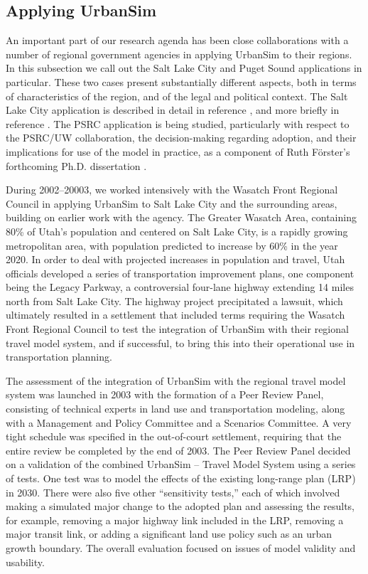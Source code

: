 
\subsection{Applying UrbanSim}
\label{sec:urbansim-applications}

An important part of our research agenda has been close collaborations with
a number of regional government agencies in applying UrbanSim to their
regions.  In this subsection we call out the Salt Lake City and Puget Sound
applications in particular.  These two cases present substantially
different aspects, both in terms of characteristics of the region, and of
the legal and political context.  The Salt Lake City application is
described in detail in reference \cite{waddell-wfrc-2006}, and more briefly
in reference \cite{waddell-sscr-2004}.  The PSRC application is being
studied, particularly with respect to the PSRC/UW collaboration, the
decision-making regarding adoption, and their implications for use of the
model in practice, as a component of Ruth F\"{o}rster's forthcoming
Ph.D. dissertation \cite{foerster-phd}.

During 2002--20003, we worked intensively with the Wasatch Front
Regional Council in applying UrbanSim to Salt Lake City and the
surrounding areas, building on earlier work with the agency.  The
Greater Wasatch Area, containing 80\% of Utah's population and
centered on Salt Lake City, is a rapidly growing metropolitan area,
with population predicted to increase by 60\% in the year 2020.  In
order to deal with projected increases in population and travel,
Utah officials developed a series of transportation improvement
plans, one component being the Legacy Parkway, a controversial
four-lane highway extending 14 miles north from Salt Lake City.  The
highway project precipitated a lawsuit, which ultimately resulted in a
settlement that included terms requiring the Wasatch Front Regional
Council to test the integration of UrbanSim with their regional
travel model system, and if successful, to bring this into their
operational use in transportation planning.

The assessment of the integration of UrbanSim with the regional
travel model system was launched in 2003 with the formation of a
Peer Review Panel, consisting of technical experts in land use and
transportation modeling, along with a Management and Policy
Committee and a Scenarios Committee.  A very tight schedule was
specified in the out-of-court settlement, requiring that the entire
review be completed by the end of 2003.  The Peer Review Panel
decided on a validation of the combined UrbanSim -- Travel Model
System using a series of tests.  One test was to model the effects
of the existing long-range plan (LRP) in 2030.  There were also five
other ``sensitivity tests,'' each of which involved making a simulated major
change to the adopted plan and assessing the results, for example,
removing a major highway link included in the LRP, removing a major
transit link, or adding a significant land use policy such as an
urban growth boundary.  The overall evaluation focused on issues of
model validity and usability.

